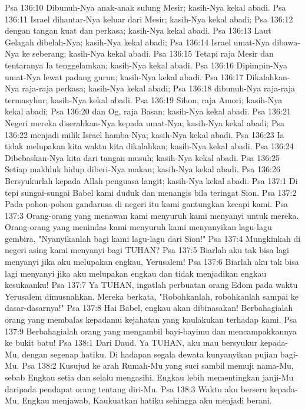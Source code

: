 Psa 136:10  Dibunuh-Nya anak-anak sulung Mesir; kasih-Nya kekal abadi.
Psa 136:11  Israel dihantar-Nya keluar dari Mesir; kasih-Nya kekal abadi;
Psa 136:12  dengan tangan kuat dan perkasa; kasih-Nya kekal abadi.
Psa 136:13  Laut Gelagah dibelah-Nya; kasih-Nya kekal abadi;
Psa 136:14  Israel umat-Nya dibawa-Nya ke seberang; kasih-Nya kekal abadi.
Psa 136:15  Tetapi raja Mesir dan tentaranya Ia tenggelamkan; kasih-Nya kekal abadi.
Psa 136:16  Dipimpin-Nya umat-Nya lewat padang gurun; kasih-Nya kekal abadi.
Psa 136:17  Dikalahkan-Nya raja-raja perkasa; kasih-Nya kekal abadi;
Psa 136:18  dibunuh-Nya raja-raja termasyhur; kasih-Nya kekal abadi.
Psa 136:19  Sihon, raja Amori; kasih-Nya kekal abadi;
Psa 136:20  dan Og, raja Basan; kasih-Nya kekal abadi.
Psa 136:21  Negeri mereka diserahkan-Nya kepada umat-Nya; kasih-Nya kekal abadi;
Psa 136:22  menjadi milik Israel hamba-Nya; kasih-Nya kekal abadi.
Psa 136:23  Ia tidak melupakan kita waktu kita dikalahkan; kasih-Nya kekal abadi.
Psa 136:24  Dibebaskan-Nya kita dari tangan musuh; kasih-Nya kekal abadi.
Psa 136:25  Setiap makhluk hidup diberi-Nya makan; kasih-Nya kekal abadi.
Psa 136:26  Bersyukurlah kepada Allah penguasa langit; kasih-Nya kekal abadi.
Psa 137:1  Di tepi sungai-sungai Babel kami duduk dan menangis bila teringat Sion.
Psa 137:2  Pada pohon-pohon gandarusa di negeri itu kami gantungkan kecapi kami.
Psa 137:3  Orang-orang yang menawan kami menyuruh kami menyanyi untuk mereka. Orang-orang yang menindas kami menyuruh kami menyanyikan lagu-lagu gembira, "Nyanyikanlah bagi kami lagu-lagu dari Sion!"
Psa 137:4  Mungkinkah di negeri asing kami menyanyi bagi TUHAN?
Psa 137:5  Biarlah aku tak bisa lagi menyanyi jika aku melupakan engkau, Yerusalem!
Psa 137:6  Biarlah aku tak bisa lagi menyanyi jika aku melupakan engkau dan tidak menjadikan engkau kesukaanku!
Psa 137:7  Ya TUHAN, ingatlah perbuatan orang Edom pada waktu Yerusalem dimusnahkan. Mereka berkata, "Robohkanlah, robohkanlah sampai ke dasar-dasarnya!"
Psa 137:8  Hai Babel, engkau akan dibinasakan! Berbahagialah orang yang membalas kepadamu kejahatan yang kaulakukan terhadap kami.
Psa 137:9  Berbahagialah orang yang mengambil bayi-bayimu dan mencampakkannya ke bukit batu!
Psa 138:1  Dari Daud. Ya TUHAN, aku mau bersyukur kepada-Mu, dengan segenap hatiku. Di hadapan segala dewata kunyanyikan pujian bagi-Mu.
Psa 138:2  Kusujud ke arah Rumah-Mu yang suci sambil memuji nama-Mu, sebab Engkau setia dan selalu mengasihi. Engkau lebih mementingkan janji-Mu daripada pendapat orang tentang diri-Mu.
Psa 138:3  Waktu aku berseru kepada-Mu, Engkau menjawab, Kaukuatkan hatiku sehingga aku menjadi berani.
